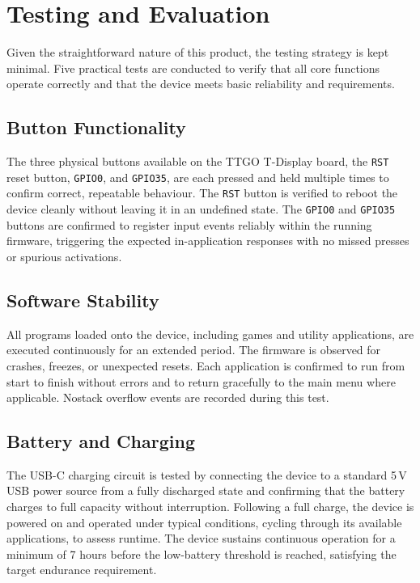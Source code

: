\section{Testing and Evaluation}

Given the straightforward nature of this product, the testing strategy is kept minimal. Five practical tests are conducted to verify that all core functions operate correctly and that the device meets basic reliability and requirements.

\subsection{Button Functionality}

The three physical buttons available on the TTGO T-Display board, the \texttt{RST} reset button, \texttt{GPIO0}, and \texttt{GPIO35}, are each pressed and held multiple times to confirm correct, repeatable behaviour. The \texttt{RST} button is verified to reboot the device cleanly without leaving it in an undefined state. The \texttt{GPIO0} and \texttt{GPIO35} buttons are confirmed to register input events reliably within the running firmware, triggering the expected in-application responses with no missed presses or spurious activations.

\subsection{Software Stability}

All programs loaded onto the device, including games and utility applications, are executed continuously for an extended period. The firmware is observed for crashes, freezes, or unexpected resets. Each application is confirmed to run from start to finish without errors and to return gracefully to the main menu where applicable. Nostack overflow events are recorded during this test.

\subsection{Battery and Charging}

The USB-C charging circuit is tested by connecting the device to a standard 5\,V USB power source from a fully discharged state and confirming that the battery charges to full capacity without interruption. Following a full charge, the device is powered on and operated under typical conditions, cycling through its available applications, to assess runtime. The device sustains continuous operation for a minimum of 7 hours before the low-battery threshold is reached, satisfying the target endurance requirement.

